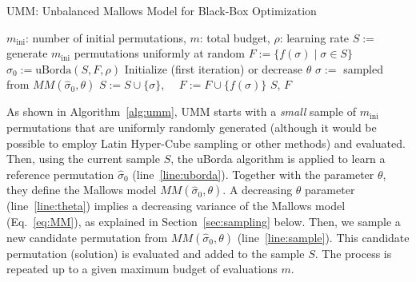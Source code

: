 \documentclass[runningheads]{llncs}
\newcommand{\assign}{\ensuremath{:=}}
\newcommand{\minit}{\ensuremath{m_\text{ini}}\xspace}
\newcommand{\FEmax}{\ensuremath{m}}
\begin{document}
\begin{algorithm}[t]
 \caption{UMM: Unbalanced Mallows Model for Black-Box Optimization}
 \label{alg:umm}
  \begin{algorithmic}[1]
    \Require $\minit$: number of initial permutations, $\FEmax$: total budget, $\rho$: learning rate
    \State $S \assign $ generate $\minit$ permutations uniformly at random
    \State $F \assign \{ f(\sigma) \mid \sigma \in S\}$ 
    \For{$i \assign \minit$ \textbf{to} $\FEmax$ \text{evaluations}}
    \State $\hat\sigma_0 \assign \text{uBorda}(S, F,\rho)$\label{line:uborda}
    \State Initialize (first iteration) or decrease  $\theta$\label{line:theta}
    \State $\sigma \assign$ sampled from  $MM(\hat\sigma_0, \theta)$\label{line:sample}
    \State $S \assign S \cup \{\sigma\}$, $\quad F \assign F \cup \{f(\sigma)\}$
    \EndFor 
    \State \Return $S$, $F$
 \end{algorithmic}
\end{algorithm}


As shown in Algorithm~\ref{alg:umm}, UMM  starts with a \emph{small} sample of $\minit$ permutations that are uniformly randomly generated (although it would be possible to employ Latin Hyper-Cube sampling or other methods) and evaluated. Then, using the current sample $S$, the uBorda algorithm is applied to learn a reference permutation $\hat{\sigma}_0$ (line~\ref{line:uborda}). 
Together with the parameter $\theta$, they define the Mallows model $MM(\hat\sigma_0, \theta)$. 
A decreasing $\theta$ parameter (line~\ref{line:theta}) implies a decreasing variance of the Mallows model (Eq.~\ref{eq:MM}), as explained in  Section~\ref{sec:sampling} below. 
Then, we sample a new candidate permutation from  $MM(\hat\sigma_0, \theta)$ (line~\ref{line:sample}). This candidate permutation (solution) is evaluated and added to the sample $S$. The process is repeated up to a given maximum budget of evaluations $\FEmax$.
\end{document}
